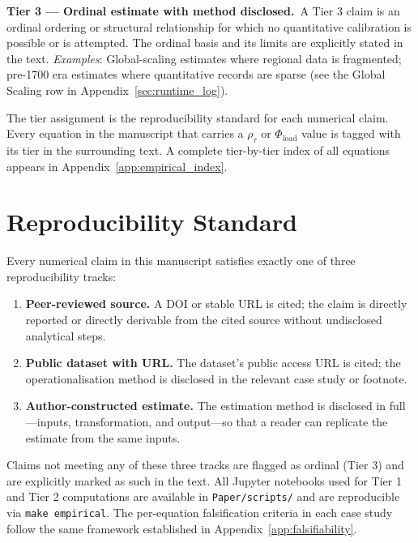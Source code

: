 \documentclass[12pt,openany]{book}
\numberwithin{equation}{chapter}
\begin{document}
\bigskip
\noindent\textbf{Tier 3 --- Ordinal estimate with method disclosed.}\ A Tier 3 claim is an ordinal ordering or structural relationship for which no quantitative calibration is possible or is attempted. The ordinal basis and its limits are explicitly stated in the text. \textit{Examples}: Global-scaling estimates where regional data is fragmented; pre-1700 era estimates where quantitative records are sparse (see the Global Scaling row in Appendix~\ref{sec:runtime_log}).

\bigskip
The tier assignment is the reproducibility standard for each numerical claim. Every equation in the manuscript that carries a $\rho_\tau$ or $\Phi_{\text{load}}$ value is tagged with its tier in the surrounding text. A complete tier-by-tier index of all equations appears in Appendix~\ref{app:empirical_index}.

\section*{Reproducibility Standard}

Every numerical claim in this manuscript satisfies exactly one of three reproducibility tracks:

\begin{enumerate}
  \item \textbf{Peer-reviewed source.} A DOI or stable URL is cited; the claim is directly reported or directly derivable from the cited source without undisclosed analytical steps.

  \item \textbf{Public dataset with URL.} The dataset's public access URL is cited; the operationalisation method is disclosed in the relevant case study or footnote.

  \item \textbf{Author-constructed estimate.} The estimation method is disclosed in full---inputs, transformation, and output---so that a reader can replicate the estimate from the same inputs.
\end{enumerate}

Claims not meeting any of these three tracks are flagged as ordinal (Tier 3) and are explicitly marked as such in the text. All Jupyter notebooks used for Tier 1 and Tier 2 computations are available in \texttt{Paper/scripts/} and are reproducible via \texttt{make empirical}. The per-equation falsification criteria in each case study follow the same framework established in Appendix~\ref{app:falsifiability}.

\end{document}
